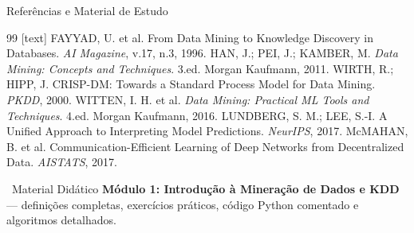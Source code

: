 \documentclass[aspectratio=169]{beamer}
\begin{document}
\begin{frame}{Referências e Material de Estudo}
    \begin{thebibliography}{99}
        [text]
        \tiny FAYYAD, U. et al. From Data Mining to Knowledge Discovery in Databases. \textit{AI Magazine}, v.17, n.3, 1996.
        \tiny HAN, J.; PEI, J.; KAMBER, M. \textit{Data Mining: Concepts and Techniques}. 3.ed. Morgan Kaufmann, 2011.
        \tiny WIRTH, R.; HIPP, J. CRISP-DM: Towards a Standard Process Model for Data Mining. \textit{PKDD}, 2000.
        \tiny WITTEN, I. H. et al. \textit{Data Mining: Practical ML Tools and Techniques}. 4.ed. Morgan Kaufmann, 2016.
        \tiny LUNDBERG, S. M.; LEE, S.-I. A Unified Approach to Interpreting Model Predictions. \textit{NeurIPS}, 2017.
        \tiny McMAHAN, B. et al. Communication-Efficient Learning of Deep Networks from Decentralized Data. \textit{AISTATS}, 2017.
    \end{thebibliography}
    \vspace{0.2cm}
    \begin{block}{\faBook\ Material Didático}
        \textbf{Módulo 1: Introdução à Mineração de Dados e KDD}
        --- definições completas, exercícios práticos, código Python comentado e algoritmos detalhados.
    \end{block}
\end{frame}
\end{document}
